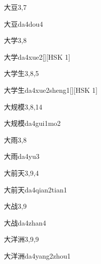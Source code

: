 \begin{entry}{大豆}{3,7}
  \begin{phonetics}{大豆}{da4dou4}
  \end{phonetics}
\end{entry}

\begin{entry}{大学}{3,8}
  \begin{phonetics}{大学}{da4xue2}[][HSK 1]
  \end{phonetics}
\end{entry}

\begin{entry}{大学生}{3,8,5}
  \begin{phonetics}{大学生}{da4xue2sheng1}[][HSK 1]
  \end{phonetics}
\end{entry}

\begin{entry}{大规模}{3,8,14}
  \begin{phonetics}{大规模}{da4gui1mo2}
  \end{phonetics}
\end{entry}

\begin{entry}{大雨}{3,8}
  \begin{phonetics}{大雨}{da4yu3}
  \end{phonetics}
\end{entry}

\begin{entry}{大前天}{3,9,4}
  \begin{phonetics}{大前天}{da4qian2tian1}
  \end{phonetics}
\end{entry}

\begin{entry}{大战}{3,9}
  \begin{phonetics}{大战}{da4zhan4}
  \end{phonetics}
\end{entry}

\begin{entry}{大洋洲}{3,9,9}
  \begin{phonetics}{大洋洲}{da4yang2zhou1}
  \end{phonetics}
\end{entry}

